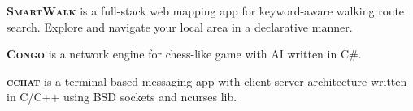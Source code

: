 
\vspace{1.0em}

\textsc{\textbf{SmartWalk}} \textsuperscript{\href{https://github.com/zhukovdm/smartwalk}{\faExternalLink*}} is a full-stack web mapping app for keyword-aware walking route search. Explore and navigate your local area in a declarative manner.

\vspace{0.7em}

\textsc{\textbf{Congo}} \textsuperscript{\href{https://github.com/zhukovdm/Congo}{\faExternalLink*}} is a network engine for chess-like game with AI written in C\#.

\vspace{0.7em}

\textsc{\textbf{cchat}} \textsuperscript{\href{https://github.com/zhukovdm/cchat}{\faExternalLink*}} is a terminal-based messaging app with client-server architecture written in C/C++ using BSD sockets and \textsf{ncurses} lib.

\vspace{1.0em}
